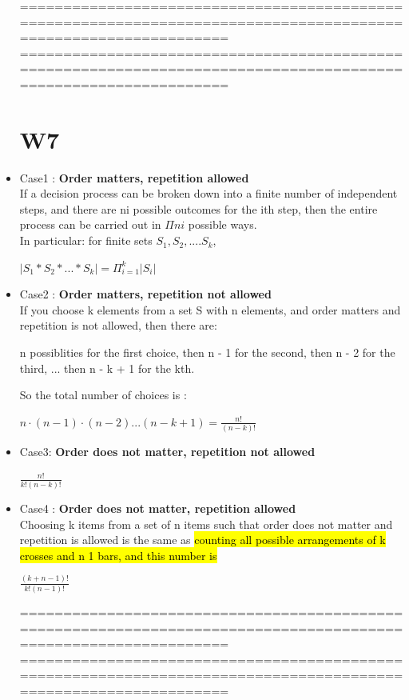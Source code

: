 \documentclass{article}
\begin{document}
\begin{itemize}
================================================================================================================
\newpage
================================================================================================================

\section{W7}

\item Case1 : \textbf{Order matters, repetition allowed} \\
If a decision process can be broken down
into a finite number of independent steps,
and there are ni possible outcomes for the ith step,
then the entire process can be carried out in $\Pi {ni}$ possible ways.\\
In particular: for finite sets $S_1,S_2,....S_k$,
\begin{center}
$|S_1 * S_2 * ... * S_k| = \Pi_{i=1}^k |S_i|$
\end{center}
\item Case2 : \textbf{Order matters, repetition not allowed}\\
If you choose k elements from a set S with n elements,
and order matters and repetition is not allowed,
then there are:
\begin{center}
n possiblities for the first choice,
then n - 1 for the second,
then n - 2 for the third,
...
then n - k + 1 for the kth.
\end{center}
So the total number of choices is :
\begin{center}
$n \cdot (n-1) \cdot (n-2) ... (n - k + 1) = \frac {n!} {(n-k)!}$
\end{center}

\item Case3: \textbf{ Order does not matter, repetition not allowed}\\

\begin{center}
$\frac {n!} {k!(n-k)!}$
\end{center}

\item Case4 : \textbf{Order does not matter, repetition allowed}\\
Choosing k items from a set of n items
such that order does not matter and repetition is allowed
is the same as \hl{counting all possible arrangements of k crosses and n  1 bars,
and this number is}
\begin{center}
$\frac{(k + n -1)!} {k!(n-1)!}$
\end{center}
================================================================================================================
\newpage
================================================================================================================

\end{itemize}
\end{document}
